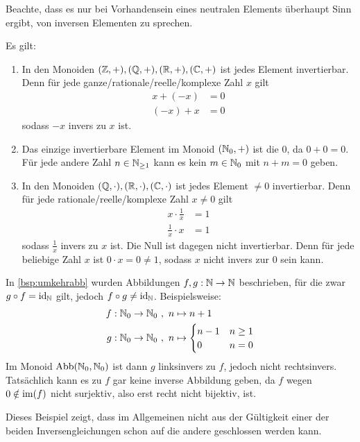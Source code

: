 \begin{bem}
    Beachte, dass es nur bei Vorhandensein eines neutralen Elements überhaupt Sinn ergibt, von inversen Elementen zu sprechen. 
\end{bem}


\begin{bsp} \label{bsp:inverse}
    Es gilt:
    \begin{enumerate}
        \item In den Monoiden $(\mathbb Z,+),(\mathbb Q,+),(\mathbb R,+),(\mathbb C,+)$ ist jedes Element invertierbar. Denn für jede ganze/rationale/reelle/komplexe Zahl $x$ gilt
        \begin{align*}
            x + (-x) & = 0 \\
            (-x) + x & = 0
        \end{align*}
        sodass $-x$ invers zu $x$ ist.
        \item Das einzige invertierbare Element im Monoid $(\mathbb N_0,+)$ ist die $0$, da $0+0=0$. Für jede andere Zahl $n\in \mathbb N_{\ge 1}$ kann es kein $m\in \mathbb N_0$ mit $n+m=0$ geben.
        \item In den Monoiden $(\mathbb Q,\cdot),(\mathbb R,\cdot),(\mathbb C,\cdot)$ ist jedes Element $\neq 0$ invertierbar. Denn für jede rationale/reelle/komplexe Zahl $x\neq 0$ gilt
        \begin{align*}
            x \cdot \frac{1}{x} & = 1 \\
            \frac{1}{x}\cdot x & = 1
        \end{align*}
        sodass $\frac{1}{x}$ invers zu $x$ ist. Die Null ist dagegen nicht invertierbar. Denn für jede beliebige Zahl $x$ ist $0\cdot x = 0\neq 1$, sodass $x$ nicht invers zur $0$ sein kann.
    \end{enumerate}
\end{bsp}


\begin{bsp}[*]
    In \cref{bsp:umkehrabb} wurden Abbildungen $f,g:\mathbb N\to \mathbb N$ beschrieben, für die zwar $g\circ f=\mathrm{id}_\mathbb N$ gilt, jedoch $f\circ g\neq \mathrm{id}_\mathbb N$. Beispielsweise:
    \begin{align*}
        f : \mathbb N_0 \to \mathbb N_0 \ &,\ n \mapsto n+1 \\
        g: \mathbb N_0 \to \mathbb N_0 \ &,\ n\mapsto \begin{cases}
            n-1 & n\ge 1 \\
            0 & n=0
        \end{cases}
    \end{align*}
    Im Monoid $\operatorname{Abb}(\mathbb N_0,\mathbb N_0)$ ist dann $g$ linksinvers zu $f$, jedoch nicht rechtsinvers. Tatsächlich kann es zu $f$ gar keine inverse Abbildung geben, da $f$ wegen $0\notin \operatorname{im}(f)$ nicht surjektiv, also erst recht nicht bijektiv, ist.

    Dieses Beispiel zeigt, dass im Allgemeinen nicht aus der Gültigkeit einer der beiden Inversengleichungen schon auf die andere geschlossen werden kann.
\end{bsp}


